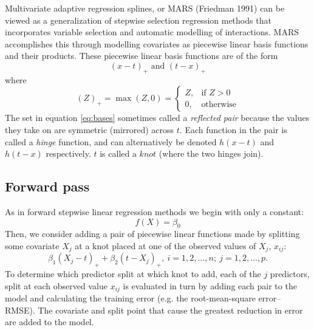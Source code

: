 \documentclass[12pt]{article}
\begin{document}
Multivariate adaptive regression splines, or MARS (Friedman 1991) can be viewed as a generalization of stepwise selection regression methods that incorporates variable selection and automatic modelling of interactions. MARS accomplishes this through modelling covariates as piecewise linear basis functions and their products. These piecewise linear basis functions are of the form 
%
\begin{equation} \label{eq:bases}
  (x - t)_{+} \text{ and } (t - x)_{+}
\end{equation} where
%
\begin{equation}
  (Z)_{+} = \max(Z, 0) = \begin{cases}
  Z, & \text{if } Z > 0 \\
  0, & \text{otherwise}
  \end{cases}
\end{equation}
The set in equation \ref{eq:bases} sometimes called a \emph{reflected pair} because the values they take on are symmetric (mirrored) across $t$. Each function in the pair is called a \emph{hinge} function, and can alternatively be denoted $h(x - t)$ and $h(t - x)$ respectively. $t$ is called a $knot$ (where the two hinges join).

\subsection{Forward pass} %
\label{sub:forward_pass}

As in forward stepwise linear regression methods we begin with only a constant:
\begin{equation}
  f(X) = \beta_{0}
\end{equation}
Then, we consider adding a pair of piecewise linear functions made by splitting some covariate $X_{j}$ at a knot placed at one of the observed values of $X_{j}$, $x_{ij}$:
\begin{equation}
\beta_{1} (X_{j} - t)_{+} + \beta_{2}(t - X_{j})_{+}, \ i = 1, 2, \ldots, n; \ j = 1, 2, \ldots, p.
\end{equation}
To determine which predictor split at which knot to add, each of the $j$ predictors, split at each observed value $x_{ij}$ is evaluated in turn by adding each pair to the model and calculating the training error (e.g. the root-mean-square error--RMSE). The covariate and split point that cause the greatest reduction in error are added to the model.
\end{document}
